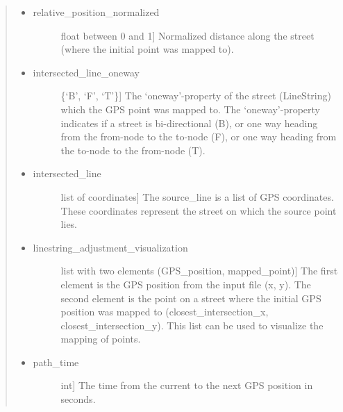 \documentclass[letterpaper,10pt,english]{sphinxmanual}
\begin{document}
\begin{fulllineitems}
\begin{quote}
\begin{description}
\begin{description}
\begin{itemize}
\item {} \begin{description}
\item[{relative\_position\_normalized}] \leavevmode{[}float between 0 and 1{]}
Normalized distance along the street (where the initial point was mapped to).

\end{description}

\item {} \begin{description}
\item[{intersected\_line\_oneway}] \leavevmode{[}\{‘B’, ‘F’, ‘T’\}{]}
The ‘oneway’-property of the street (LineString) which the GPS point was mapped to. The ‘oneway’-property indicates if a street is bi-directional (B), or one way heading from the from-node to the to-node (F), or one way heading from the to-node to the from-node (T).

\end{description}

\item {} \begin{description}
\item[{intersected\_line}] \leavevmode{[}list of coordinates{]}
The source\_line is a list of GPS coordinates. These coordinates represent the street on which the source point lies.

\end{description}

\item {} \begin{description}
\item[{linestring\_adjustment\_visualization}] \leavevmode{[}list with two elements (GPS\_position, mapped\_point){]}
The first element is the GPS position from the input file (x, y). The second element is the point on a street where the initial GPS position was mapped to (closest\_intersection\_x, closest\_intersection\_y). This list can be used to visualize the mapping of points.

\end{description}

\item {} \begin{description}
\item[{path\_time}] \leavevmode{[}int{]}
The time from the current to the next GPS position in seconds.

\end{description}


\end{itemize}
\end{description}
\end{description}
\end{quote}
\end{fulllineitems}
\end{document}
